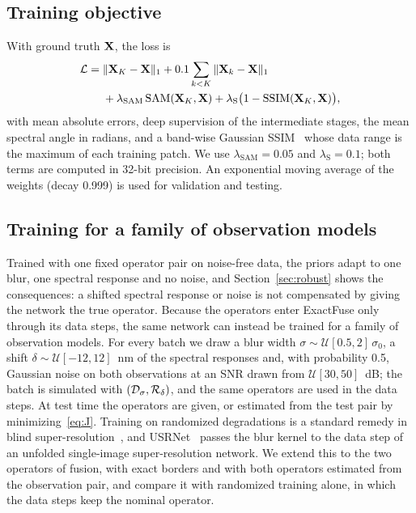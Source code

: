 \documentclass[journal]{IEEEtran}
\begin{document}
\subsection{Training objective}
With ground truth $\mathbf{X}$, the loss is
\begin{equation}
\begin{split}
\mathcal{L}={}&\|\mathbf{X}_K-\mathbf{X}\|_1+0.1\sum_{k<K}\|\mathbf{X}_k-\mathbf{X}\|_1\\
&+\lambda_{\mathrm{SAM}}\,\mathrm{SAM}(\mathbf{X}_K,\mathbf{X})+\lambda_{\mathrm{S}}\big(1-\mathrm{SSIM}(\mathbf{X}_K,\mathbf{X})\big),
\end{split}
\label{eq:loss}
\end{equation}
with mean absolute errors, deep supervision of the intermediate stages, the mean spectral angle in radians, and a band-wise Gaussian SSIM~\cite{wang2004ssim} whose data range is the maximum of each training patch. We use $\lambda_{\mathrm{SAM}}=0.05$ and $\lambda_{\mathrm{S}}=0.1$; both terms are computed in 32-bit precision. An exponential moving average of the weights (decay 0.999) is used for validation and testing.

\subsection{Training for a family of observation models}
\label{sec:randtrain}
Trained with one fixed operator pair on noise-free data, the priors adapt to one blur, one spectral response and no noise, and Section~\ref{sec:robust} shows the consequences: a shifted spectral response or noise is not compensated by giving the network the true operator. Because the operators enter ExactFuse only through its data steps, the same network can instead be trained for a family of observation models. For every batch we draw a blur width $\sigma\sim\mathcal{U}[0.5,2]\,\sigma_0$, a shift $\delta\sim\mathcal{U}[-12,12]$~nm of the spectral responses and, with probability 0.5, Gaussian noise on both observations at an SNR drawn from $\mathcal{U}[30,50]$~dB; the batch is simulated with $(\mathcal{D}_\sigma,\mathcal{R}_\delta)$, and the same operators are used in the data steps. At test time the operators are given, or estimated from the test pair by minimizing~\eqref{eq:J}. Training on randomized degradations is a standard remedy in blind super-resolution~\cite{zhang2018srmd,zhang2021bsrgan}, and USRNet~\cite{zhang2020usrnet} passes the blur kernel to the data step of an unfolded single-image super-resolution network. We extend this to the two operators of fusion, with exact borders and with both operators estimated from the observation pair, and compare it with randomized training alone, in which the data steps keep the nominal operator.
\end{document}
